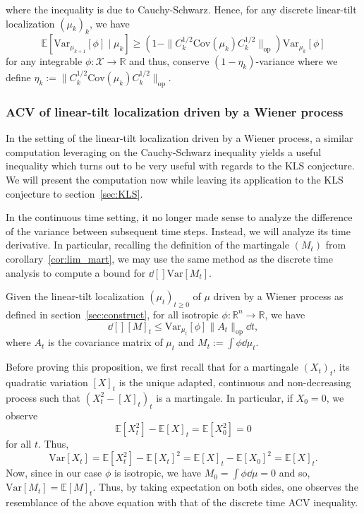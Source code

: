 where the inequality is due to Cauchy-Schwarz. Hence, for any discrete linear-tilt 
localization \((\mu_k)_k\), we have
\begin{equation}\label{eq:linear-tilt_ACV}
  \mathbb{E}[\text{Var}_{\mu_{k + 1}}[\phi] \mid \mu_k] \ge 
    (1 - \|C_k^{1 / 2}\text{Cov}(\mu_k)C_k^{1 / 2}\|_{\text{op}})\text{Var}_{\mu_k}[\phi]
\end{equation}
for any integrable \(\phi : \mathcal{X} \to \mathbb{R}\) and thus, conserve \((1 - \eta_k)\)-variance 
where we define \(\eta_k := \|C_k^{1 / 2}\text{Cov}(\mu_k)C_k^{1 / 2}\|_{\text{op}}\). 

\subsubsection{ACV of linear-tilt localization driven by a Wiener process}

In the setting of the linear-tilt localization driven by a Wiener process, a similar computation 
leveraging on the Cauchy-Schwarz inequality yields a useful inequality which turns out to be very 
useful with regards to the KLS conjecture. We will present the computation now while leaving its application to 
the KLS conjecture to section~\ref{sec:KLS}.

In the continuous time setting, it no longer made sense to analyze the difference of the variance 
between subsequent time steps. Instead, we will analyze its time derivative. In particular, recalling 
the definition of the martingale \((M_t)\) from corollary~\ref{cor:lim_mart}, we may use the same 
method as the discrete time analysis to compute a bound for \(\dd[] \text{Var}[M_t]\).

\begin{proposition}\label{prop:linear-tilt_ACV}
  Given the linear-tilt localization \((\mu_t)_{t \ge 0}\) of \(\mu\) driven by a Wiener process as defined 
  in section~\ref{sec:construct}, for all isotropic \(\phi : \mathbb{R}^n \to \mathbb{R}\), we have 
  \[\dd[] [M]_t \le \text{Var}_{\mu_t}[\phi] \|A_t\|_\text{op} \dd t,\]
  where \(A_t\) is the covariance matrix of \(\mu_t\) and \(M_t := \int \phi \dd \mu_t\).
\end{proposition}

Before proving this proposition, we first recall that for a martingale \((X_t)_t\), its quadratic variation 
\([X]_t\) is the unique adapted, continuous and non-decreasing process such that \((X_t^2 - [X]_t)_t\) 
is a martingale. In particular, if \(X_0 = 0\), we observe 
\[\mathbb{E}[X_t^2] - \mathbb{E}[X]_t = \mathbb{E}[X_0^2] = 0\]
for all \(t\). Thus, 
\[\text{Var}[X_t] = \mathbb{E}[X_t^2] - \mathbb{E}[X_t]^2 = \mathbb{E}[X]_t - \mathbb{E}[X_0]^2 = \mathbb{E}[X]_t.\]
Now, since in our case \(\phi\) is isotropic, we have \(M_0 = \int \phi \dd \mu = 0\) and so,
\(\text{Var}[M_t] = \mathbb{E}[M]_t\). Thus, by taking expectation on both sides, one observes the resemblance 
of the above equation with that of the discrete time ACV inequality. 

